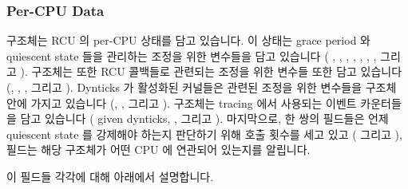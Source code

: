 \subsubsection{Per-CPU Data}
\label{app:rcuimpl:rcutreewt:Per-CPU Data}

 구조체는 RCU 의 per-CPU 상태를 담고 있습니다.
이 상태는 grace period 와 quiescent state 들을 관리하는 조정을 위한 변수들을
담고 있습니다 ( , , ,
, , , , 그리고
).
 구조체는 또한 RCU 콜백들로 관련되는 조정을 위한 변수들 또한 담고
있습니다 (, , , 그리고 ).
Dynticks 가 활성화된 커널들은 관련된 조정을 위한 변수들을  구조체
안에 가지고 있습니다
(, , 그리고 ).
 구조체는 tracing 에서 사용되는 이벤트 카운터들을 담고 있습니다
( given dynticks, , 그리고 ).
마지막으로, 한 쌍의 필드들은 언제 quiescent state 를 강제해야 하는지 판단하기
위해  호출 횟수를 세고 있고 ( 그리고
),  필드는 해당  구조체가 어떤
CPU 에 연관되어 있는지를 알립니다.

이 필드들 각각에 대해 아래에서 설명합니다.
\iffalse

The \co{rcu_data} structure contains RCU's per-CPU state.
It contains control variables governing grace periods and
quiescent states (\co{completed}, \co{gpnum}, \co{passed_quiesc_completed},
\co{passed_quiesc}, \co{qs_pending}, \co{beenonline}, \co{mynode},
and \co{grpmask}).
The \co{rcu_data} structure also contains control variables pertaining
to RCU callbacks
(\co{nxtlist}, \co{nxttail}, \co{qlen}, and \co{blimit}).
Kernels with dynticks enabled will have relevant control variables in
the \co{rcu_data} structure
(\co{dynticks}, \co{dynticks_snap}, and \co{dynticks_nmi_snap}).
The \co{rcu_data} structure contains event counters used by tracing
(\co{dynticks_fqs} given dynticks, \co{offline_fqs}, and \co{resched_ipi}).
Finally, a pair of fields count calls to \co{rcu_pending()} in order
to determine when to force quiescent states (\co{n_rcu_pending} and
\co{n_rcu_pending_force_qs}), and a \co{cpu} field indicates which
CPU to which a given \co{rcu_data} structure corresponds.

Each of these fields is described below.
\fi


